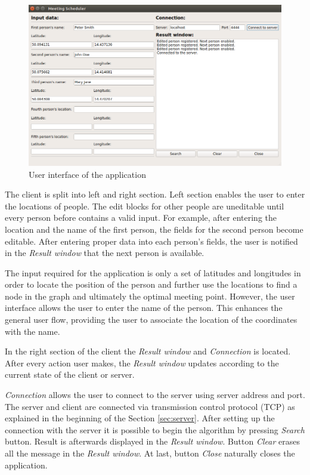 \documentclass[thesis=M,english]{FITthesis}[2012/10/20]
\begin{document}
\begin{figure}[H]
\centering
\includegraphics[width=1\textwidth]{pics/UIFinal}
\caption{User interface of the application}
\label{pic:UIFinal}
\end{figure}

The client is split into left and right section. Left section enables the user to enter the locations of people. The edit blocks for other people are uneditable until every person before contains a valid input. For example, after entering the location and the name of the first person, the fields for the second person become editable. After entering proper data into each person's fields, the user is notified in the \textit{Result window} that the next person is available. 

The input required for the application is only a set of latitudes and longitudes in order to locate the position of the person and further use the locations to find a node in the graph and ultimately the optimal meeting point. However, the user interface allows the user to enter the name of the person. This enhances the general user flow, providing the user to associate the location of the coordinates with the name.

In the right section of the client the \textit{Result window} and \textit{Connection} is located. After every action user makes, the \textit{Result window} updates according to the current state of the client or server.

\textit{Connection} allows the user to connect to the server using server address and port. The server and client are connected via transmission control protocol (TCP) as explained in the beginning of the Section \ref{sec:server}. After setting up the connection with the server it is possible to begin the algorithm by pressing \textit{Search} button. Result is afterwards displayed in the \textit{Result window}. Button \textit{Clear} erases all the message in the \textit{Result window}. At last, button \textit{Close} naturally closes the application.
\end{document}

